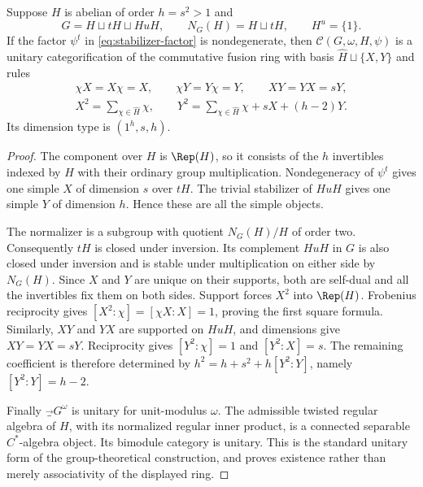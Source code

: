 \begin{theorem}\label{thm:three-coset}
Suppose $H$ is abelian of order $h=s^2>1$ and
\[
 G=H\sqcup tH\sqcup HuH,\qquad
 N_G(H)=H\sqcup tH,\qquad H^u=\{1\}.
\]
If the factor $\psi^t$ in \eqref{eq:stabilizer-factor} is nondegenerate,
then $\mathcal C(G,\omega,H,\psi)$ is a unitary categorification of the
commutative fusion ring with basis $\widehat H\sqcup\{X,Y\}$ and rules
\begin{equation}\label{eq:three-coset-ring}
\begin{gathered}
 \chi X=X\chi=X,\qquad\chi Y=Y\chi=Y,\qquad XY=YX=sY,\\
 X^2=\sum_{\chi\in\widehat H}\chi,\qquad
 Y^2=\sum_{\chi\in\widehat H}\chi+sX+(h-2)Y.
\end{gathered}
\end{equation}
Its dimension type is $(1^h,s,h)$.
\end{theorem}
\begin{proof}
The component over $H$ is $\Rep(H)$, so it consists of the $h$ invertibles
indexed by $\widehat H$ with their ordinary group multiplication.
Nondegeneracy of $\psi^t$ gives one simple $X$ of dimension $s$ over
$tH$. The trivial stabilizer of $HuH$ gives one simple $Y$ of dimension
$h$. Hence these are all the simple objects.

The normalizer is a subgroup with quotient $N_G(H)/H$ of order two.
Consequently $tH$ is closed under inversion. Its complement $HuH$ in
$G$ is also closed under inversion and is stable under multiplication
on either side by $N_G(H)$. Since $X$ and $Y$ are unique on their
supports, both are self-dual and all the invertibles fix them on both
sides. Support forces $X^2$ into $\Rep(H)$. Frobenius reciprocity gives
$[X^2:\chi]=[\chi X:X]=1$, proving the first square formula. Similarly,
$XY$ and $YX$ are supported on $HuH$, and dimensions give $XY=YX=sY$.
Reciprocity gives $[Y^2:\chi]=1$ and $[Y^2:X]=s$. The remaining
coefficient is therefore determined by
$h^2=h+s^2+h[Y^2:Y]$, namely $[Y^2:Y]=h-2$.

Finally $\Vec_G^\omega$ is unitary for unit-modulus $\omega$. The
admissible twisted regular algebra of $H$, with its normalized regular
inner product, is a connected separable $C^*$-algebra object. Its
bimodule category is unitary. This is the standard unitary form of the
group-theoretical construction, and proves existence rather than merely
associativity of the displayed ring.
\end{proof}

